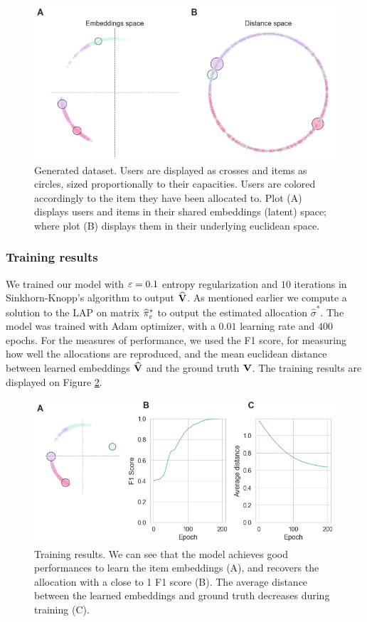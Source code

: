 \begin{figure}[h]
    \centering
    \includegraphics[width=.9\columnwidth]{images/simca/dataset.png}
    \caption{Generated dataset. Users are displayed as crosses and items as circles, sized proportionally to their capacities. Users are colored accordingly to the item they have been allocated to. Plot (A) displays users and items in their shared embeddings (latent) space; where plot (B) displays them in their underlying euclidean space.}
    \label{fig:toy_dataset}
\end{figure}

\subsubsection*{Training results}
We trained our model with $\varepsilon=0.1$ entropy regularization and $10$ iterations in Sinkhorn-Knopp's algorithm to output $\widehat{\mathbf{V}}$. As mentioned earlier we compute a solution to the LAP on matrix $\widehat{\pi}^*_{\varepsilon}$ to output the estimated allocation $\widehat{\sigma}^*$. The model was trained with Adam optimizer, with a $0.01$ learning rate and $400$ epochs. For the measures of performance, we used the F1 score, for measuring how well the allocations are reproduced, and the mean euclidean distance between learned embeddings $\widehat{\mathbf{V}}$ and the ground truth $\mathbf{V}$. The training results are displayed on Figure \ref{fig:learned_embeddings}.

\begin{figure}[h]
    \centering
    \includegraphics[width=.9\columnwidth]{images/simca/learned_embeddings.png}
    \caption{
        Training results. We can see that the model achieves good performances to learn the item embeddings (A), and recovers the allocation with a close to 1 F1 score (B). The average distance between the learned embeddings and ground truth decreases during training (C).
    }
    \label{fig:learned_embeddings}
\end{figure}

